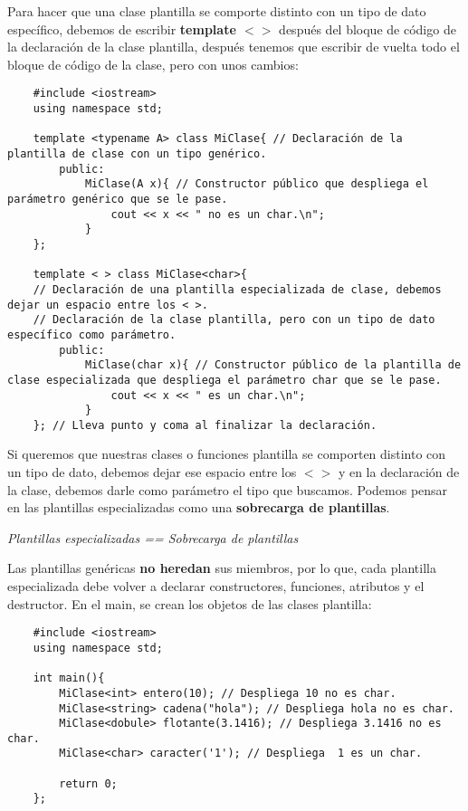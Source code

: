 Para hacer que una clase plantilla se comporte distinto con un tipo de dato específico, debemos de escribir \textbf{template $< >$} después del bloque de código de la declaración de la clase plantilla, después tenemos que escribir de vuelta todo el bloque de código de la clase, pero con unos cambios:
\begin{lstlisting}
    #include <iostream>
    using namespace std;
    
    template <typename A> class MiClase{ // Declaración de la plantilla de clase con un tipo genérico.
        public:
            MiClase(A x){ // Constructor público que despliega el parámetro genérico que se le pase.
                cout << x << " no es un char.\n";
            }
    };
    
    template < > class MiClase<char>{
    // Declaración de una plantilla especializada de clase, debemos dejar un espacio entre los < >.
    // Declaración de la clase plantilla, pero con un tipo de dato específico como parámetro.
        public:
            MiClase(char x){ // Constructor público de la plantilla de clase especializada que despliega el parámetro char que se le pase.
                cout << x << " es un char.\n";
            }
    }; // Lleva punto y coma al finalizar la declaración.
\end{lstlisting}

Si queremos que nuestras clases o funciones plantilla se comporten distinto con un tipo de dato, debemos dejar ese espacio entre los $< >$ y en la declaración de la clase, debemos darle como parámetro el tipo que buscamos. Podemos pensar en las plantillas especializadas como una \textbf{sobrecarga de plantillas}.
\begin{center}
    \textit{Plantillas especializadas == Sobrecarga de plantillas}
\end{center}

Las plantillas genéricas \textbf{no heredan} sus miembros, por lo que, cada plantilla especializada debe volver a declarar constructores, funciones, atributos y el destructor. En el main, se crean los objetos de las clases plantilla:
\begin{lstlisting}
    #include <iostream>
    using namespace std;
    
    int main(){
        MiClase<int> entero(10); // Despliega 10 no es char.
        MiClase<string> cadena("hola"); // Despliega hola no es char.
        MiClase<dobule> flotante(3.1416); // Despliega 3.1416 no es char.
        MiClase<char> caracter('1'); // Despliega  1 es un char.
        
        return 0;
    };
\end{lstlisting}



